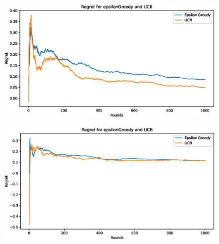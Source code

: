\begin{figure}[h]
	\centering
	\begin{minipage}{.4\textwidth}
	  \centering
	  \includegraphics[width=0.9\linewidth]{Images/Regret5_1000.eps}
	  \label{fig:UCB_13000}
	\end{minipage}%
	\begin{minipage}{.4\textwidth}
		\centering
		\includegraphics[width=0.9\linewidth]{Images/Regret20_1000.eps}
		\label{fig:epsilon_10020}
	\end{minipage}
\end{figure}

